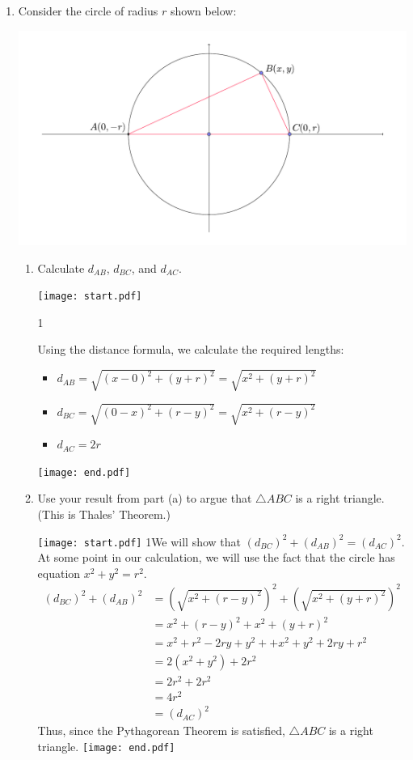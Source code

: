 \documentclass[12pt]{article}
\begin{document}
\begin{enumerate}
\item Consider the circle of radius $r$ shown below:

\begin{center}
\includegraphics[scale=0.5]{circle.pdf}
\end{center}

\begin{enumerate}

\item Calculate $d_{AB}$, $d_{BC}$, and $d_{AC}$.  

\texttt{[image: start.pdf]}
{{{1\linewidth}{Using the distance formula, we calculate the required lengths:
\begin{itemize}
\item $d_{AB}=\sqrt{(x-0)^2+(y+r)^2}=\sqrt{x^2+(y+r)^2}$
\item $d_{BC}=\sqrt{(0-x)^2+(r-y)^2}=\sqrt{x^2+(r-y)^2}$
\item $d_{AC}=2r$
\end{itemize}}}}
\texttt{[image: end.pdf]}


\item Use your result from part (a) to argue that $\triangle ABC$ is a right triangle.  (This is Thales' Theorem.)

\texttt{[image: start.pdf]}
{{{1\linewidth}{We will show that $(d_{BC})^2+(d_{AB})^2=(d_{AC})^2$.  At some point in our calculation, we will use the fact that the circle has equation $x^2+y^2=r^2$.
\begin{align*}
(d_{BC})^2+(d_{AB})^2 &=\left(\sqrt{x^2+(r-y)^2}\right)^2+\left(\sqrt{x^2+(y+r)^2}\right)^2\\
&=x^2+(r-y)^2+x^2+(y+r)^2\\
&=x^2+r^2-2ry+y^2++x^2 +y^2+2ry+r^2\\
&=2(x^2+y^2)+2r^2\\
&=2r^2+2r^2 \\
&=4r^2\\
&=(d_{AC})^2
\end{align*}
Thus, since the Pythagorean Theorem is satisfied, $\triangle ABC$ is a right triangle.
}}}
\texttt{[image: end.pdf]}



\end{enumerate}
\end{enumerate}
\end{document}
